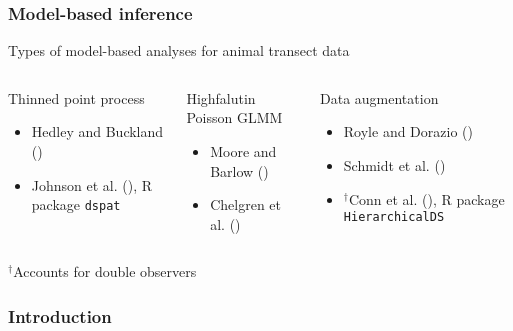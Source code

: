 \documentclass[serif,mathserif]{beamer}
\begin{document}
\begin{frame}
  \frametitle{Model-based inference}
  Types of model-based analyses for animal transect data
  \begin{columns}[t]
  \column{1.33in}
  \begin{block}{Thinned point process}
    \begin{itemize}
    \item Hedley and Buckland (\citeyear{HedleyBuckland2004})
    \item Johnson et al. (\citeyear{JohnsonEtAl2010}), R package {\tt dspat}
    \end{itemize}
  \end{block}
  \column{1.33in}
  \begin{block}{Highfalutin Poisson GLMM}
    \begin{itemize}
      \item Moore and Barlow (\citeyear{MooreBarlow2011})
      \item Chelgren et al. (\citeyear{ChelgrenEtAl2011})
    \end{itemize}
  \end{block}
  \column{1.33in}
  \begin{block}{Data augmentation}
    \begin{itemize}
      \item Royle and Dorazio (\citeyear{RoyleDorazio2008})
      \item Schmidt et al. (\citeyear{SchmidtEtAl2011})
      \item $^\dag$Conn et al. (\citeyear{ConnEtAl2012}), R package {\tt HierarchicalDS}
    \end{itemize}
  \end{block}
  \end{columns}
  $^\dag$Accounts for double observers
\end{frame}



\begin{frame}
  \frametitle{Introduction}
  \begin{center}
   \end{center}
\end{frame}
\end{document}
